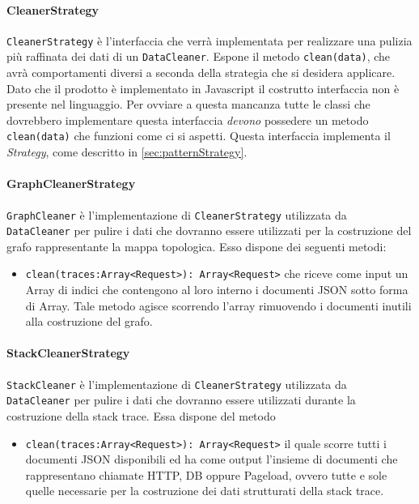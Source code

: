 \paragraph{CleanerStrategy}\Spazio
\label{sec:CleanerStrategy}
\texttt{CleanerStrategy} è l'interfaccia che verrà implementata per realizzare una pulizia più raffinata dei dati di un \texttt{DataCleaner}. Espone il metodo \texttt{clean(data)}, che avrà comportamenti diversi a seconda della strategia che si desidera applicare. Dato che il prodotto è implementato in Javascript il costrutto interfaccia non è presente nel linguaggio. Per ovviare a questa mancanza tutte le classi che dovrebbero implementare questa interfaccia \emph{devono} possedere un metodo \texttt{clean(data)} che funzioni come ci si aspetti. Questa interfaccia implementa il  \emph{Strategy}, come descritto in \ref{sec:patternStrategy}.
	
	
\paragraph{GraphCleanerStrategy}\Spazio
\label{sec:GraphCleaner}
\texttt{GraphCleaner} è l'implementazione di \texttt{CleanerStrategy} utilizzata da \texttt{DataCleaner} per pulire i dati che dovranno essere utilizzati per la costruzione del grafo rappresentante la mappa topologica. Esso dispone dei seguenti metodi:
\begin{itemize}
	\item \texttt{clean(traces:Array<Request>): Array<Request>} che riceve come input un Array di indici che contengono al loro interno i documenti JSON sotto forma di Array. Tale metodo agisce scorrendo l'array rimuovendo i documenti inutili alla costruzione del grafo.
\end{itemize}

\paragraph{StackCleanerStrategy} \Spazio
\label{sec:StackCleaner}
\texttt{StackCleaner} è l'implementazione di \texttt{CleanerStrategy} utilizzata da \texttt{DataCleaner} per pulire i dati che dovranno essere utilizzati durante la costruzione della stack trace. Essa dispone del metodo
\begin{itemize}
	\item \texttt{clean(traces:Array<Request>): Array<Request>} il quale scorre tutti i documenti JSON disponibili ed ha come output l'insieme di documenti che rappresentano chiamate HTTP, DB oppure Pageload, ovvero tutte e sole quelle necessarie per la costruzione dei dati strutturati della stack trace.
\end{itemize}



